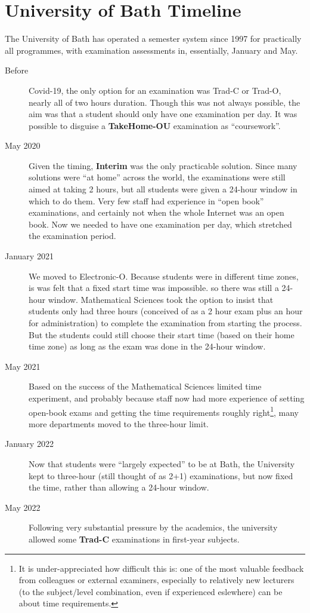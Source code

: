 \documentclass{article}
\begin{document}
\section{University of Bath Timeline}
The University of Bath has operated a semester system since 1997 for practically all programmes, with examination assessments in, essentially, January and May.
\begin{description}
\item[Before]Covid-19, the only option for an examination was Trad-C or Trad-O, nearly all of two hours duration. Though this was not always possible, the aim was that a student should only have one examination per day. It was possible to disguise a {\bf TakeHome-OU} examination as ``coursework''.
\item[May 2020]Given the timing, {\bf Interim} was the only practicable solution. Since many solutions were ``at home'' across the world, the examinations were still aimed at taking 2 hours, but all students were given a 24-hour window in which to do them. Very few staff had experience in ``open book'' examinations, and certainly not when the whole Internet was an open book. Now we needed to have one examination per day, which stretched the examination period.
\item[January 2021]We moved to Electronic-O. Because students were in different time zones, is was felt that a fixed start time was impossible. so there was still a 24-hour window. Mathematical Sciences took the option to insist that students only had three hours (conceived of as a 2 hour exam plus an hour for administration) to complete the examination from starting the process. But the students could still choose their start time (based on their home time zone) as long as the exam was done in the 24-hour window.
\item[May 2021]Based on the success of the Mathematical Sciences limited time experiment, and probably because staff now had more experience of setting open-book exams and getting the time requirements roughly right\footnote{It is under-appreciated how difficult this is: one of the most valuable feedback from colleagues or external examiners, especially to relatively new lecturers (to the subject/level combination, even if experienced eslewhere) can be about time requirements.}, many more departments moved to the three-hour limit.
\item[January 2022]Now that students were ``largely expected'' to be at Bath, the University kept to three-hour (still thought of as 2+1) examinations, but now fixed the time, rather than allowing a 24-hour window.
\item[May 2022]Following very substantial pressure by the academics, the university allowed some {\bf Trad-C} examinations in first-year subjects.
\end{description}
\end{document}
